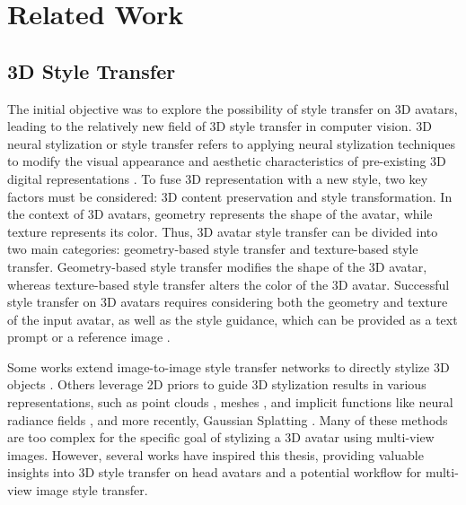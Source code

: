 \chapter{Related Work}
\label{chap:relatedwork}

\section{3D Style Transfer}

The initial objective was to explore the possibility of style transfer on 3D avatars, leading to the relatively new field of 3D style transfer in computer vision. 3D neural stylization or style transfer refers to applying neural stylization techniques to modify the visual appearance and aesthetic characteristics of pre-existing 3D digital representations \citep{Chen.2023}. To fuse 3D representation with a new style, two key factors must be considered: 3D content preservation and style transformation. In the context of 3D avatars, geometry represents the shape of the avatar, while texture represents its color. Thus, 3D avatar style transfer can be divided into two main categories: geometry-based style transfer and texture-based style transfer. Geometry-based style transfer modifies the shape of the 3D avatar, whereas texture-based style transfer alters the color of the 3D avatar. Successful style transfer on 3D avatars requires considering both the geometry and texture of the input avatar, as well as the style guidance, which can be provided as a text prompt \citep{Nguyen-Phuoc.2023, Zhang.2023, Mendiratta.2023} or a reference image \citep{Han.2021, Abdal.2023, Zhang.2024, Jaganathan.2024}. 

Some works extend image-to-image style transfer networks to directly stylize 3D objects \citep{Kang.2023}. Others leverage 2D priors to guide 3D stylization results in various representations, such as point clouds \citep{Cao.2020, Segu.2020, Luo.2021}, meshes \citep{Yin.2021, Nguyen-Phuoc.2023, Kang.2023, Yang.2023}, and implicit functions like neural radiance fields \citep{Haque.2023, Kamata.2023, Patashnik.2024}, and more recently, Gaussian Splatting \citep{Wang.2024, Liu.2024, Wu.2024, Chen.2024, Jaganathan.2024}. Many of these methods are too complex for the specific goal of stylizing a 3D avatar using multi-view images. However, several works have inspired this thesis, providing valuable insights into 3D style transfer on head avatars and a potential workflow for multi-view image style transfer.

